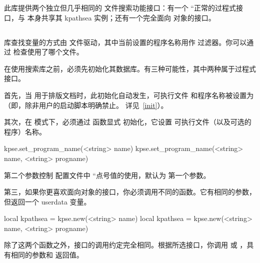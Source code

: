 
此库提供两个独立但几乎相同的 \KPATHSEA 文件搜索功能接口：有一个 ``正常的过程式接口，与 \LUATEX 本身共享其 kpathsea 实例；还有一个完全面向
对象的接口。

\subsection{}


库查找变量的方式由  文件驱动，其中当前设置的程序名称用作
过滤器。你可以通过  检查使用了哪个文件。

在使用搜索库之前，必须先初始化其数据库。有三种可能性，其中两种属于过程式
接口。

首先，当 \LUATEX 用于排版文档时，此初始化自动发生，\KPATHSEA 可执行文件
和程序名称被设置为 （即，除非用户的启动脚本明确禁止。
详见~\ref{init}）。

其次，在 \TEXLUA 模式下，必须通过  函数显式
初始化，它设置 \KPATHSEA 可执行文件（以及可选的程序）名称。

\begin{typing}
kpse.set_program_name(<string> name)
kpse.set_program_name(<string> name, <string> progname)
\end{typing}

第二个参数控制  配置文件中 ``点号值的使用，默认为
第一个参数。

第三，如果你更喜欢面向对象的接口，你必须调用不同的函数。它有相同的参数，
但返回一个 userdata 变量。

\begin{typing}
local kpathsea = kpse.new(<string> name)
local kpathsea = kpse.new(<string> name, <string> progname)
\end{typing}

除了这两个函数之外，接口的调用约定完全相同。根据所选接口，你调用
 或 ，具有相同的参数和
返回值。

\subsection{}



